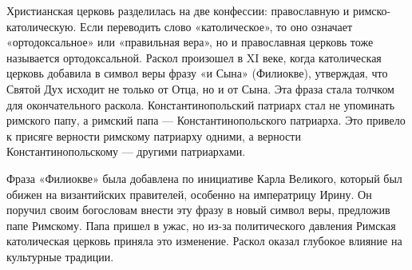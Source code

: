 
Христианская церковь разделилась на две конфессии: православную и римско-католическую. Если переводить слово «католическое», то оно означает «ортодоксальное» или «правильная вера», но и православная церковь тоже называется ортодоксальной. Раскол произошел в XI веке, когда католическая церковь добавила в символ веры фразу «и Сына» (Филиокве), утверждая, что Святой Дух исходит не только от Отца, но и от Сына. Эта фраза стала толчком для окончательного раскола. Константинопольский патриарх стал не упоминать римского папу, а римский папа — Константинопольского патриарха. Это привело к присяге верности римскому патриарху одними, а верности Константинопольскому — другими патриархами.

Фраза «Филиокве» была добавлена по инициативе Карла Великого, который был обижен на византийских правителей, особенно на императрицу Ирину. Он поручил своим богословам внести эту фразу в новый символ веры, предложив папе Римскому. Папа пришел в ужас, но из-за политического давления Римская католическая церковь приняла это изменение. Раскол оказал глубокое влияние на культурные традиции.

